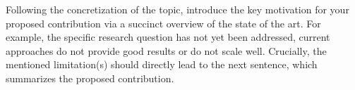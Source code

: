 


\noindent
Following the concretization of the topic, introduce the key motivation for your proposed contribution via a succinct overview of the state of the art.
For example, the specific research question has not yet been addressed, current approaches do not provide good results or do not scale well.
Crucially, the mentioned limitation(s) should directly lead to the next sentence, which summarizes the proposed contribution.

